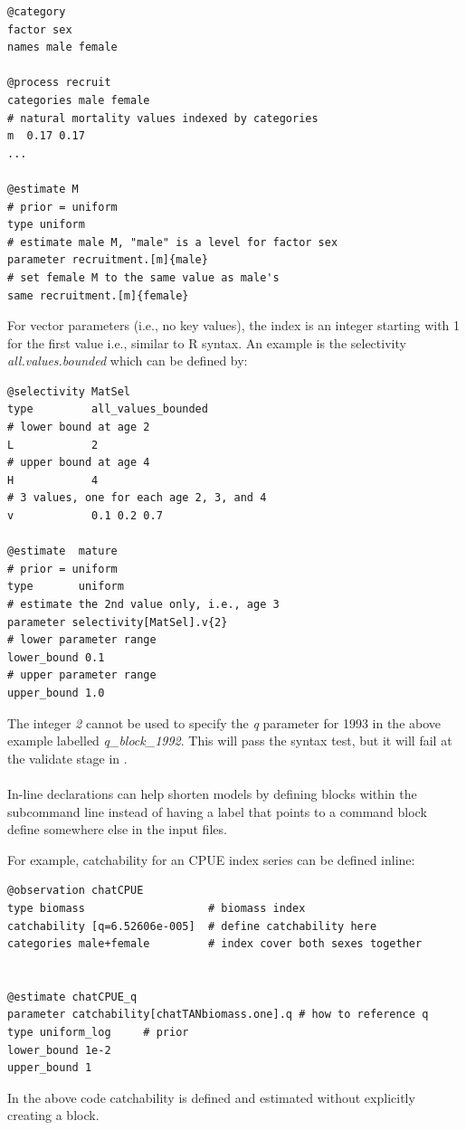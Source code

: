 {\small{\begin{verbatim}
@category
factor sex
names male female

@process recruit
categories male female
# natural mortality values indexed by categories
m  0.17 0.17
...

@estimate M
# prior = uniform
type uniform
# estimate male M, "male" is a level for factor sex
parameter recruitment.[m]{male}
# set female M to the same value as male's
same recruitment.[m]{female}
\end{verbatim}}}

For vector parameters (i.e., no key values), the index is an integer starting with 1 for the first value i.e., similar to R syntax. An example is the selectivity \textit{all.values.bounded} which can be defined by:

{\small{\begin{verbatim}
@selectivity MatSel
type         all_values_bounded
# lower bound at age 2
L            2
# upper bound at age 4
H            4
# 3 values, one for each age 2, 3, and 4
v            0.1 0.2 0.7

@estimate  mature
# prior = uniform
type       uniform
# estimate the 2nd value only, i.e., age 3
parameter selectivity[MatSel].v{2}
# lower parameter range
lower_bound 0.1
# upper parameter range
upper_bound 1.0
\end{verbatim}}}

The integer \textit{{2}} cannot be used to specify the \textit{q} parameter for 1993 in the above example labelled \textit{q\_block\_1992}. This will pass the syntax test, but it will fail at the validate stage in \CNAME.


\paragraph*{\label{sec:declare}}

In-line declarations can help shorten models by defining \command{} blocks within the subcommand line instead of having a label that points to a command block define somewhere else in the input files.

For example, catchability for an CPUE index series can be defined inline:

{\small{\begin{verbatim}
@observation chatCPUE
type biomass                   # biomass index
catchability [q=6.52606e-005]  # define catchability here
categories male+female         # index cover both sexes together


@estimate chatCPUE_q
parameter catchability[chatTANbiomass.one].q # how to reference q
type uniform_log     # prior
lower_bound 1e-2
upper_bound 1
\end{verbatim}}}

In the above code catchability is defined and estimated without explicitly creating a  block.



